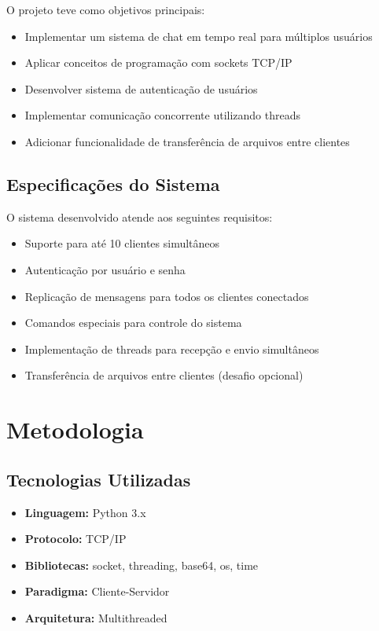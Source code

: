 \documentclass[12pt,a4paper]{article}
\begin{document}
O projeto teve como objetivos principais:

\begin{itemize}
    \item Implementar um sistema de chat em tempo real para múltiplos usuários
    \item Aplicar conceitos de programação com sockets TCP/IP
    \item Desenvolver sistema de autenticação de usuários
    \item Implementar comunicação concorrente utilizando threads
    \item Adicionar funcionalidade de transferência de arquivos entre clientes
\end{itemize}

\subsection{Especificações do Sistema}

O sistema desenvolvido atende aos seguintes requisitos:

\begin{itemize}
    \item Suporte para até 10 clientes simultâneos
    \item Autenticação por usuário e senha
    \item Replicação de mensagens para todos os clientes conectados
    \item Comandos especiais para controle do sistema
    \item Implementação de threads para recepção e envio simultâneos
    \item Transferência de arquivos entre clientes (desafio opcional)
\end{itemize}

\section{Metodologia}

\subsection{Tecnologias Utilizadas}

\begin{itemize}
    \item \textbf{Linguagem:} Python 3.x
    \item \textbf{Protocolo:} TCP/IP
    \item \textbf{Bibliotecas:} socket, threading, base64, os, time
    \item \textbf{Paradigma:} Cliente-Servidor
    \item \textbf{Arquitetura:} Multithreaded
\end{itemize}
\end{document}
